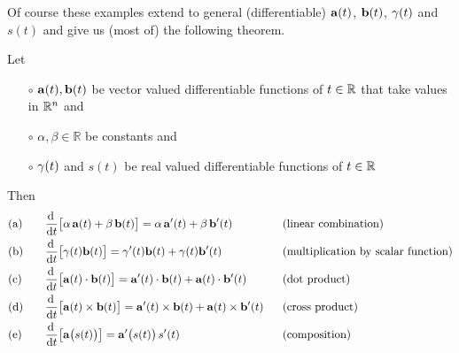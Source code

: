 Of course these examples extend to general (differentiable)
$\mathbf{a}(t)$, $\mathbf{b}(t)$, $\gamma(t)$ and $s(t)$ and give us (most of) the following theorem.

\begin{theorem}\label{thm:DIFFalgebra}
Let 
\begin{itemize}\itemsep1pt \parskip0pt  %
\item[$\circ$]
$\mathbf{a}(t),\mathbf{b}(t)$ be vector valued differentiable functions of $t\in\mathbb{R}$
that take values in $\mathbb{R}^n$ and
\item[$\circ$]
 $\alpha,\beta \in \mathbb{R}$ be constants and 
\item[$\circ$]
 $\gamma(t)$ and $s(t)$ be real valued differentiable functions of $t\in\mathbb{R}$
\end{itemize}
Then
\begin{alignat*}{5}
&\text{(a)}\quad &&\diff{}{t}\big[\alpha\,\va(t)+\beta\,\vb(t)\big]
         =\alpha\,\va'(t)+\beta\,\vb'(t)
           &&\text{(linear combination)}
\\
&\text{(b)} &&\diff{}{t}\big[\ga(t)\vb(t)\big]
         =\ga'(t)\vb(t)+\ga(t)\vb'(t)
           &&\text{(multiplication by scalar function)}
\\
&\text{(c)} &&\diff{}{t}\big[\va(t)\cdot\vb(t)\big]
         =\va'(t)\cdot\vb(t)+\va(t)\cdot\vb'(t)
           &&\text{(dot product)}
\\
&\text{(d)} &&\diff{}{t}\big[\va(t)\times\vb(t)\big]
         =\va'(t)\times\vb(t)+\va(t)\times\vb'(t)
           \ \ &&\text{(cross product)}
\\
&\text{(e)} &&\diff{}{t}\big[\va\big(s(t)\big)\big]
         =\va'\big(s(t)\big)\,s'(t)
           &&\text{(composition)}
\end{alignat*}
\end{theorem}

